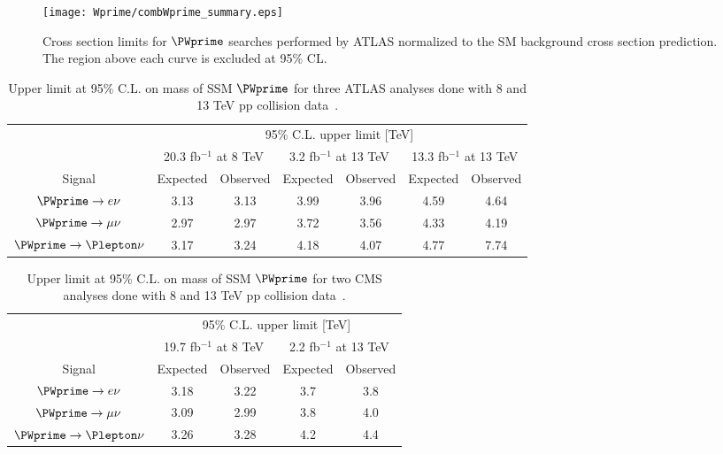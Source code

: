 \begin{figure}[]
 \texttt{[image: Wprime/combWprime\_summary.eps]}
  \caption{
Cross section limits for $\PWprime$ searches performed by ATLAS
normalized to the SM background cross section prediction.
The region above each curve is excluded at 95\% CL.
}
  \label{fig:Wprime_allResults}
\end{figure}


\begin{table*}[]
\begin{center}
\begin{tabular}{c||c|c||c|c||c|c}
 & \multicolumn{6}{c}{95\%  C.L. upper limit [TeV]} \\
 & \multicolumn{2}{c||}{20.3 fb$^{-1}$ at 8 TeV} & \multicolumn{2}{c||}{3.2 fb$^{-1}$ at 13 TeV} & \multicolumn{2}{c}{13.3 fb$^{-1}$ at 13 TeV} \\
 \hline
Signal & Expected & Observed & Expected & Observed & Expected & Observed \\
\hline
\rule{0pt}{3ex}
$\PWprime \to e\nu$ & 3.13 & 3.13 & 3.99 & 3.96 & 4.59 & 4.64 \\
\hline
$\PWprime \to \mu\nu$ & 2.97 & 2.97 & 3.72 & 3.56 & 4.33 & 4.19 \\
\hline
$\PWprime \to \Plepton\nu$ & 3.17 & 3.24 & 4.18 & 4.07 & 4.77 & 7.74 \\
\end{tabular}
\end{center}
 \caption{Upper limit at 95\% C.L. on mass of SSM $\PWprime$ for three ATLAS analyses done with 8 and 13 TeV pp collision data~\cite{wprime_8TeV,Aaboud:2016zkn,wprime_atlas_13TeV_13fb}.}
\label{tab:Wprime_limit_vs_years_ATLAS}
\end{table*}


\begin{table*}[]
\begin{center}
\begin{tabular}{c||c|c||c|c}
 & \multicolumn{4}{c}{95\%  C.L. upper limit [TeV]} \\
 & \multicolumn{2}{c||}{19.7 fb$^{-1}$ at 8 TeV} & \multicolumn{2}{c||}{2.2 fb$^{-1}$ at 13 TeV}  \\
 \hline
Signal & Expected & Observed & Expected & Observed  \\
\hline
\rule{0pt}{3ex}
$\PWprime \to e\nu$ & 3.18 & 3.22 & 3.7 & 3.8 \\
\hline
$\PWprime \to \mu\nu$ & 3.09 & 2.99 & 3.8 & 4.0 \\
\hline
$\PWprime \to \Plepton\nu$ & 3.26 & 3.28 & 4.2 & 4.4 \\
\end{tabular}
\end{center}
 \caption{Upper limit at 95\% C.L. on mass of SSM $\PWprime$ for two CMS analyses done with 8 and 13 TeV pp collision data~\cite{wprime_cms_8TeV,wprime_cms_13TeV}.}
\label{tab:Wprime_limit_vs_years_CMS}
\end{table*}

